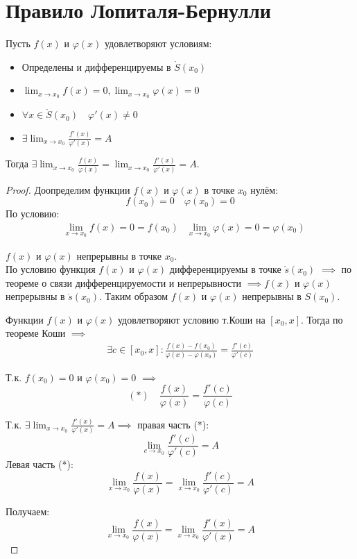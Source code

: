 \section{Правило Лопиталя-Бернулли}

\begin{theorem}
  Пусть $f(x)$ и  $\varphi(x)$ удовлетворяют условиям:
  \begin{itemize}
    \item Определены и дифференцируемы в $\mathring{S}(x_0)$
    \item $\lim_{x \to x_0} f(x) = 0, \lim_{x \to x_0} \varphi(x) = 0$
    \item $\forall x \in \mathring{S}(x_0) \quad \varphi'(x) \neq 0$
    \item $\exists \lim_{x \to x_0} \frac{f'(x)}{\varphi'(x)} = A$
  \end{itemize}
  Тогда $\exists \lim_{x \to x_0} \frac{f(x)}{\varphi(x)} = \lim_{x \to x_0} \frac{f'(x)}{\varphi'(x)} = A$.
\end{theorem}
\begin{proof}
  Доопределим функции $f(x)$ и $\varphi(x)$ в точке $x_0$ нулём: \[
  f(x_0) = 0 \quad \varphi(x_0) = 0
  \] 
  По условию:
  \begin{align*}
    &\lim_{x \to x_0} f(x) = 0 = f(x_0)
    &\lim_{x \to x_0} \varphi(x) = 0 = \varphi(x_0)
  \end{align*}
  
  $f(x)$ и  $\varphi(x)$ непрерывны в точке $x_0$.\\
  По условию функция $f(x)$ и  $\varphi(x)$ дифференцируемы в точке $\mathring{s}(x_0)$ $\implies$ по теореме о связи дифференцируемости и непрерывности $\implies f(x)$ и $\varphi(x)$ непрерывны в $\mathring{s}(x_0)$. Таким образом $f(x)$ и  $\varphi(x)$ непрерывны в $S(x_0)$.

  Функции $f(x)$ и  $\varphi(x)$ удовлетворяют условию т.Коши на $[x_0, x]$. Тогда по теореме Коши $\implies$ 
  \begin{gather*}
    \exists c \in [x_0, x] : \frac{f(x) - f(x_0)}{\varphi(x) - \varphi(x_0)} = \frac{f'(c)}{\varphi'(c)} \tag{*} 
  \end{gather*}

  Т.к. $f(x_0) = 0$ и $\varphi(x_0) = 0$ $\implies$ \[
    (*) \quad \boxed{\frac{f(x)}{\varphi(x)} = \frac{f'(c)}{\varphi(c)}}
  \] 

  Т.к. $\exists \lim_{x \to x_0} \frac{f'(x)}{\varphi'(x)} = A \implies$ правая часть (*): \[
  \lim_{c \to x_0} \frac{f'(c)}{\varphi'(c)} = A
  \] 
  Левая часть (*): \[
  \lim_{x \to x_0} \frac{f(x)}{\varphi(x)} = \lim_{x \to x_0} \frac{f'(c)}{\varphi'(c)} = A
  \] 

  Получаем: \[
  \lim_{x \to x_0} \frac{f(x)}{\varphi(x)} = \lim_{x \to x_0} \frac{f'(x)}{\varphi'(x)} = A
  \] 
\end{proof}


